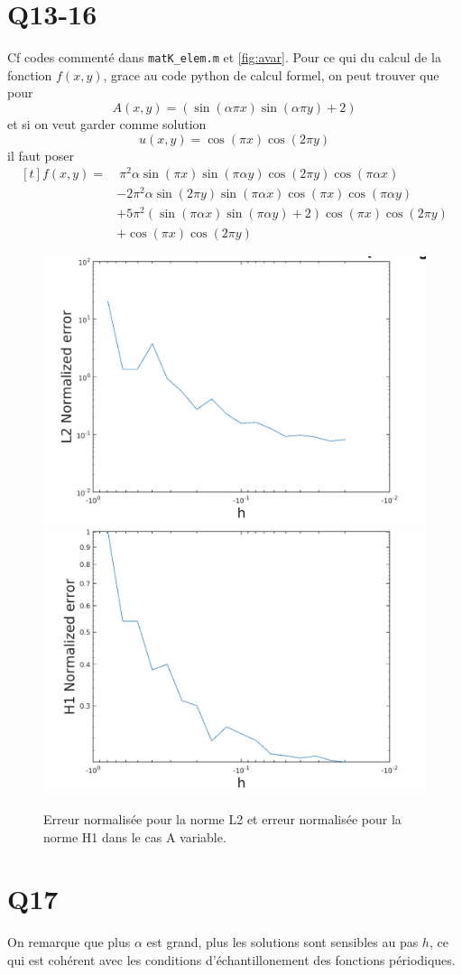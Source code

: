 \documentclass[11pt]{article}
\begin{document}
\section{Q13-16}

Cf codes commenté dans \texttt{matK\_elem.m} et \autoref{fig:avar}. Pour ce qui du calcul de la fonction $f(x,y)$, grace au code python de calcul formel, on peut trouver que pour
\begin{equation}
  A(x,y)=(\sin(\alpha \pi x)\sin(\alpha \pi y) + 2)
\end{equation}
et si on veut garder comme solution
\begin{equation}
  u(x,y)=\cos(\pi x)\cos(2\pi y)
\end{equation}
il faut poser
\begin{equation}
  \begin{aligned}[t]
    f(x,y)=&~\pi^2\alpha\sin(\pi x)\sin(\pi\alpha y)\cos(2\pi y)\cos(\pi\alpha x)\\
    &- 2\pi^2\alpha\sin(2\pi y)\sin(\pi\alpha x)\cos(\pi x)\cos(\pi\alpha y) \\
    &+ 5\pi^2(\sin(\pi\alpha x)\sin(\pi\alpha y) + 2)\cos(\pi x)\cos(2\pi y) \\
    &+ \cos(\pi x)\cos(2\pi y)
  \end{aligned}
\end{equation}

\begin{figure}
  \centering
  \includegraphics[width=.6\textwidth]{L2_Avar} \\
  \includegraphics[width=.6\textwidth]{H1_Avar}
  \caption{Erreur normalisée pour la norme L2 et erreur normalisée pour la norme H1 dans le cas A variable.}
  \label{fig:avar}
\end{figure}

\section{Q17}

On remarque que plus $\alpha$ est grand, plus les solutions sont sensibles au pas $h$, ce qui est cohérent avec les conditions d'échantillonement des fonctions périodiques.
\end{document}
